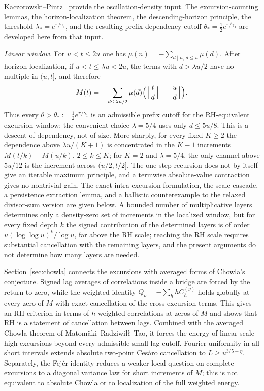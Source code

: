 \documentclass[11pt]{amsart}
\numberwithin{equation}{section}
\theoremstyle{plain}
\theoremstyle{definition}
\theoremstyle{remark}
\begin{document}
Kaczorowski--Pintz~\cite{KP86} provide the oscillation-density input.  The
excursion-counting lemmas, the horizon-localization theorem, the
descending-horizon principle, the threshold
$\lambda_*=e^{\pi/\gamma_1}$, and the resulting prefix-dependency cutoff
$\theta_*=\tfrac12e^{\pi/\gamma_1}$ are developed here from that input.

\smallskip\noindent\emph{Linear window.} For $u<t\le2u$ one has
$\mu(n)=-\sum_{d\mid n,\,d\le u}\mu(d)$.  After horizon localization,
if $u<t\le\lambda u<2u$, the terms with $d>\lambda u/2$ have no multiple
in $(u,t]$, and therefore
\[
M(t)=-\sum_{d\le\lambda u/2}\mu(d)
\Bigl(\Bigl\lfloor\frac td\Bigr\rfloor-\Bigl\lfloor\frac ud\Bigr\rfloor\Bigr).
\]
Thus every $\theta>\theta_*:=\frac12e^{\pi/\gamma_1}$ is an admissible
prefix cutoff for the RH-equivalent excursion window; the convenient choice
$\lambda=5/4$ uses only $d\le5u/8$.  This is a descent of dependency, not
of size.  More sharply, for every fixed $K\ge2$ the dependence above
$\lambda u/(K+1)$ is concentrated in the $K-1$ increments
$M(t/k)-M(u/k)$, $2\le k\le K$; for $K=2$ and $\lambda=5/4$, the only channel
above $5u/12$ is the increment across $(u/2,t/2]$.  The one-step recursion
does not by itself give an iterable maximum principle, and a termwise
absolute-value contraction gives no nontrivial gain.  The exact
intra-excursion formulation, the scale cascade, a persistence extraction
lemma, and a ballistic counterexample to the relaxed divisor-sum version are
given below. A bounded number of multiplicative layers determines only a
density-zero set of increments in the localized window, but for every fixed
depth $k$ the signed contribution of the determined layers is of order
$u(\log\log u)^k/\log u$, far above the RH scale; reaching the RH scale
requires substantial cancellation with the remaining layers, and the present
arguments do not determine how many layers are needed.

Section~\ref{sec:chowla} connects the excursions with averaged forms of
Chowla's conjecture. Signed lag averages of correlations inside a bridge are
forced by the return to zero, while the weighted identity
$Q_\nu=-\sum_hhC^{(\nu)}_h$ holds globally at every zero of $M$ with exact
cancellation of the cross-excursion terms. This gives an RH criterion in
terms of $h$-weighted correlations at zeros of $M$ and shows that RH is a
statement of cancellation between lags. Combined with the averaged Chowla theorem of Matom\"aki--Radziwi\l\l--Tao, it forces the energy of linear-scale high excursions beyond every admissible small-lag cutoff. Fourier uniformity in all short intervals extends absolute two-point Ces\`aro cancellation to $L\ge u^{3/5+\eta}$. Separately, the Fej\'er identity reduces a weaker local question on complete excursions to a diagonal variance law for short increments of $M$; this is not equivalent to absolute Chowla or to localization of the full weighted energy.
\end{document}
